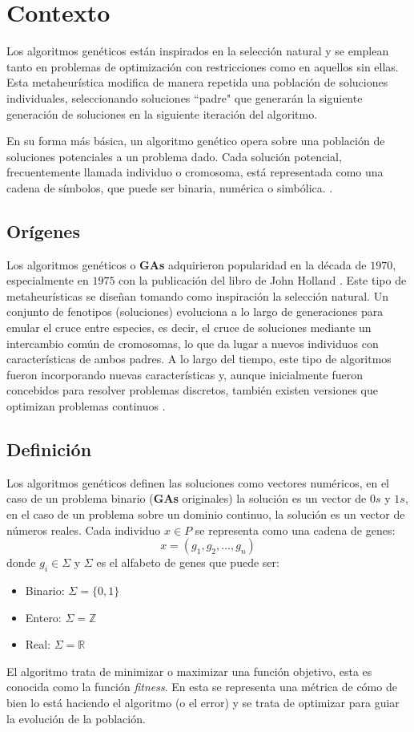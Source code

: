 \documentclass[12pt,letterpaper]{article}
\begin{document}
\section{Contexto}
Los algoritmos genéticos están inspirados en la selección natural y se emplean tanto en problemas de optimización con restricciones como en aquellos sin ellas. Esta metaheurística modifica de manera repetida una población de soluciones individuales, seleccionando soluciones ``padre" que generarán la siguiente generación de soluciones en la siguiente iteración del algoritmo.

En su forma más básica, un algoritmo genético opera sobre una población de soluciones potenciales a un problema dado. Cada solución potencial, frecuentemente llamada individuo o cromosoma, está representada como una cadena de símbolos, que puede ser binaria, numérica o simbólica. \cite{10.5555/522098}.

\subsection{Orígenes}
Los algoritmos genéticos o \textbf{GAs} adquirieron popularidad en la década de $1970$, especialmente en $1975$ con la publicación del libro de John Holland \cite{Holland:1975}. Este tipo de metaheurísticas se diseñan tomando como inspiración la selección natural. Un conjunto de fenotipos (soluciones) evoluciona a lo largo de generaciones para emular el cruce entre especies, es decir, el cruce de soluciones mediante un intercambio común de cromosomas, lo que da lugar a nuevos individuos con características de ambos padres. A lo largo del tiempo, este tipo de algoritmos fueron incorporando nuevas características y, aunque inicialmente fueron concebidos para resolver problemas discretos, también existen versiones que optimizan problemas continuos \cite{eiben2015}.

\subsection{Definición}
Los algoritmos genéticos definen las soluciones como vectores numéricos, en el caso de un problema binario (\textbf{GAs} originales) la solución es un vector de $0s$ y $1s$, en el caso de un problema sobre un dominio continuo, la solución es un vector de números reales.
Cada individuo $x \in P$ se representa como una cadena de genes:
\[ x = (g_1, g_2, ..., g_n) \]
donde $g_i \in \Sigma$ y $\Sigma$ es el alfabeto de genes que puede ser:
\begin{itemize}
    \item Binario: $\Sigma = \{0,1\}$
    \item Entero: $\Sigma = \mathbb{Z}$
    \item Real: $\Sigma = \mathbb{R}$
\end{itemize}
El algoritmo trata de minimizar o maximizar una función objetivo, esta es conocida como la función \textit{fitness}. En esta se representa una métrica de cómo de bien lo está haciendo el algoritmo (o el error) y se trata de optimizar para guiar la evolución de la población.
\end{document}
